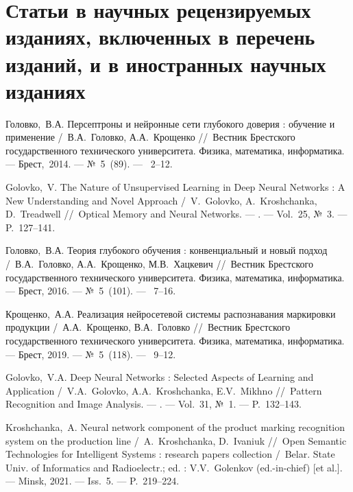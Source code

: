 \ifx\isabstract\undefined 
\section* {Статьи в научных рецензируемых изданиях, включенных в перечень изданий, и в иностранных научных изданиях}
\fi

Головко,~В.А. Персептроны и нейронные сети глубокого доверия : обучение и применение /~В.А.~Головко, А.А.~Крощенко
\newblock //~Вестник Брестского государственного технического университета. Физика, математика, информатика. ---
\newblock Брест,~2014. ---
\newblock №~5~(89). ---
~2--12.

Golovko,~V. The Nature of Unsupervised Learning in Deep Neural Networks : A New Understanding and Novel Approach /~V.~Golovko, A.~Kroshchanka, D.~Treadwell
\newblock //~Optical Memory and Neural Networks. ---
. ---
\newblock Vol.~25, №~3. ---
\newblock P.~127--141.

Головко,~В.А. Теория глубокого обучения : конвенциальный и новый подход /~В.А.~Головко, А.А.~Крощенко, М.В.~Хацкевич
\newblock //~Вестник Брестского государственного технического университета. Физика, математика, информатика. ---
\newblock Брест, 2016. ---
\newblock №~5~(101). ---
~7--16.

Крощенко,~А.А. Реализация нейросетевой системы распознавания маркировки продукции /~А.А.~Крощенко, В.А.~Головко
\newblock //~Вестник Брестского государственного технического университета. Физика, математика, информатика. ---
\newblock Брест, 2019. ---
\newblock №~5~(118). ---
~9--12.

Golovko,~V.A.  Deep Neural Networks : Selected Aspects of Learning and Application /~V.A.~Golovko, A.A.~Kroshchanka, E.V.~Mikhno
\newblock //~Pattern Recognition and Image Analysis. ---
. ---
\newblock Vol.~31, №~1. ---
\newblock P.~132--143.

Kroshchanka,~A. Neural network component of the product marking recognition system on the production line /~A.~Kroshchanka, D.~Ivaniuk
\newblock //~Open Semantic Technologies for Intelligent Systems : research papers collection
\newblock /~Belar. State Univ. of Informatics and Radioelectr.; ed. : V.V.~Golenkov (ed.-in-chief) [et al.]. ---
\newblock Minsk, 2021. ---
\newblock Iss.~5. ---
\newblock P.~219--224.

